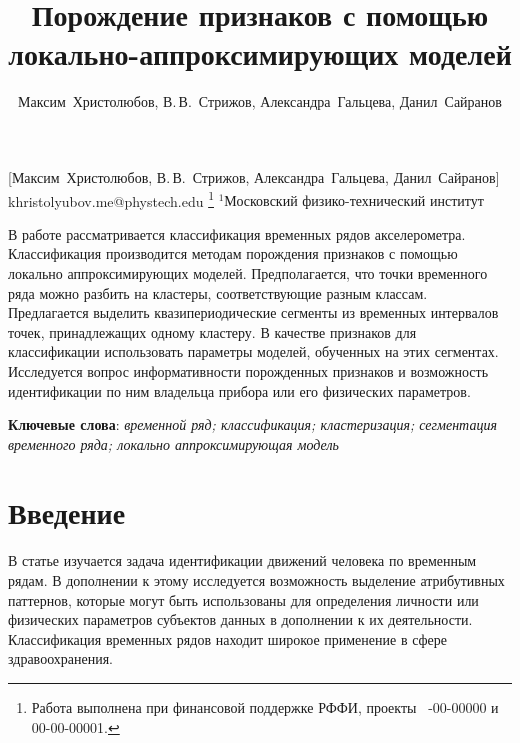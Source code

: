 \documentclass[12pt, twoside]{article}
\begin{document}
\title
    [Порождение признаков с помощью локально-аппроксимирующих моделей] %
    {Порождение признаков с помощью локально-аппроксимирующих моделей}
\author
    [Максим~Христолюбов, В.\,В.~Стрижов] %
    {Максим~Христолюбов, В.\,В.~Стрижов, Александра~Гальцева, Данил~Сайранов} %
    [Максим~Христолюбов, В.\,В.~Стрижов, Александра~Гальцева, Данил~Сайранов] %
\email
    {khristolyubov.me@phystech.edu}
\thanks
    {Работа выполнена при
     финансовой поддержке РФФИ, проекты \No\ -00-00000 и 00-00-00001.}
\organization
    {$^1$Московский физико-технический институт}
\abstract
    {В работе рассматривается классификация временных рядов акселерометра. Классификация производится методам порождения признаков с помощью локально аппроксимирующих моделей. Предполагается, что точки временного ряда можно разбить на кластеры, соответствующие разным классам. Предлагается выделить квазипериодические сегменты из временных интервалов точек, принадлежащих одному кластеру. В качестве признаков для классификации использовать параметры моделей, обученных на этих сегментах. Исследуется вопрос информативности порожденных признаков и возможность идентификации по ним владельца прибора или его физических параметров.
	
\bigskip
\noindent
\textbf{Ключевые слова}: \emph {временной ряд; классификация; кластеризация; сегментация временного ряда; локально аппроксимирующая модель}
}

\maketitle
\linenumbers

\section{Введение}

В статье изучается задача идентификации движений человека по временным рядам. В дополнении к этому исследуется возможность выделение атрибутивных паттернов, которые могут быть использованы для определения личности или физических параметров субъектов данных в дополнении к их деятельности. Классификация временных рядов находит широкое применение в сфере здравоохранения.
\end{document}
